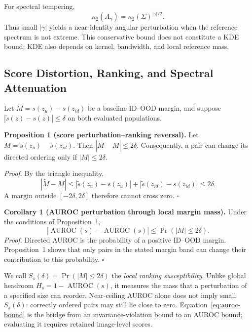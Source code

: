 \documentclass[11pt,a4paper]{article}
\begin{document}
For spectral tempering,
\begin{equation}
\kappa_2(A_\gamma)=\kappa_2(\Sigma)^{|\gamma|/2}.
\end{equation}
Thus small $|\gamma|$ yields a near-identity angular perturbation when the reference spectrum is not extreme. This conservative bound does not constitute a KDE bound; KDE also depends on kernel, bandwidth, and local reference mass.

\subsection{Score Distortion, Ranking, and Spectral Attenuation}
Let $M=s(z_u)-s(z_{id})$ be a baseline ID--OOD margin, and suppose $|\widetilde{s}(z)-s(z)|\le\delta$ on both evaluated populations.

\textbf{Proposition 1 (score perturbation--ranking reversal).} Let $\widetilde{M}=\widetilde{s}(z_u)-\widetilde{s}(z_{id})$. Then $|\widetilde{M}-M|\le2\delta$. Consequently, a pair can change its directed ordering only if $|M|\le2\delta$.

\emph{Proof.} By the triangle inequality,
\begin{equation}
|\widetilde{M}-M|
\le |\widetilde{s}(z_u)-s(z_u)|
 +|\widetilde{s}(z_{id})-s(z_{id})|
\le2\delta.
\end{equation}
A margin outside $[-2\delta,2\delta]$ therefore cannot cross zero. \hfill$\square$

\textbf{Corollary 1 (AUROC perturbation through local margin mass).} Under the conditions of Proposition~1,
\begin{equation}
|\operatorname{AUROC}(\widetilde{s})-\operatorname{AUROC}(s)|
\le \Pr(|M|\le2\delta).
\label{eq:auroc-bound}
\end{equation}
\emph{Proof.} Directed AUROC is the probability of a positive ID--OOD margin. Proposition~1 shows that only pairs in the stated margin band can change their contribution to this probability. \hfill$\square$

We call $S_s(\delta)=\Pr(|M|\le2\delta)$ the \emph{local ranking susceptibility}. Unlike global headroom $H_s=1-\operatorname{AUROC}(s)$, it measures the mass that a perturbation of a specified size can reorder. Near-ceiling AUROC alone does not imply small $S_s(\delta)$: correctly ordered pairs may still lie close to zero. Equation~\eqref{eq:auroc-bound} is the bridge from an invariance-violation bound to an AUROC bound; evaluating it requires retained image-level scores.
\end{document}
